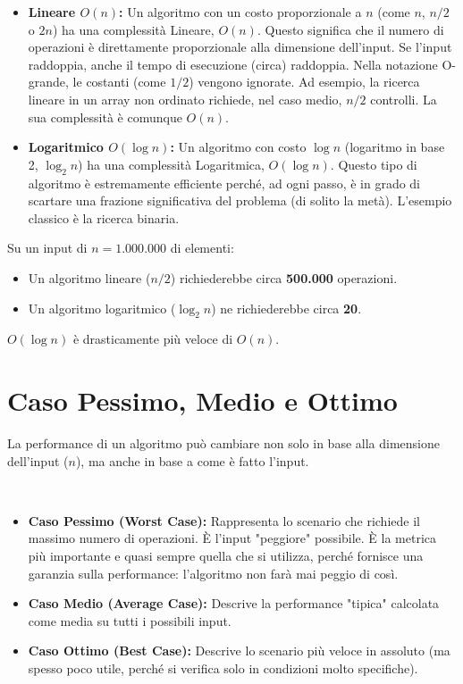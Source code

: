 \begin{itemize}
    \item \textbf{Lineare $O(n)$:} Un algoritmo con un costo proporzionale a $n$ (come $n$, $n/2$ o $2n$) ha una complessità Lineare, $O(n)$. Questo significa che il numero di operazioni è direttamente proporzionale alla dimensione dell'input. Se l'input raddoppia, anche il tempo di esecuzione (circa) raddoppia. Nella notazione O-grande, le costanti (come $1/2$) vengono ignorate. Ad esempio, la ricerca lineare in un array non ordinato richiede, nel caso medio, $n/2$ controlli. La sua complessità è comunque $O(n)$.
    
    \item \textbf{Logaritmico $O(\log n)$:} Un algoritmo con costo $\log n$ (logaritmo in base 2, $\log_2 n$) ha una complessità Logaritmica, $O(\log n)$. Questo tipo di algoritmo è estremamente efficiente perché, ad ogni passo, è in grado di scartare una frazione significativa del problema (di solito la metà). L'esempio classico è la ricerca binaria.
\end{itemize}

\begin{example}
Su un input di $n = 1.000.000$ di elementi:
\begin{itemize}
    \item Un algoritmo lineare ($n/2$) richiederebbe circa \textbf{500.000} operazioni.
    \item Un algoritmo logaritmico ($\log_2 n$) ne richiederebbe circa \textbf{20}.
\end{itemize}
$O(\log n)$ è drasticamente più veloce di $O(n)$.
\end{example}

\section{Caso Pessimo, Medio e Ottimo}
La performance di un algoritmo può cambiare non solo in base alla dimensione dell'input ($n$), ma anche in base a come è fatto l'input.

\begin{observation} \\
\begin{itemize}
    \item \textbf{Caso Pessimo (Worst Case):} Rappresenta lo scenario che richiede il massimo numero di operazioni. È l'input "peggiore" possibile. È la metrica più importante e quasi sempre quella che si utilizza, perché fornisce una garanzia sulla performance: l'algoritmo non farà mai peggio di così.
    \item \textbf{Caso Medio (Average Case):} Descrive la performance "tipica" calcolata come media su tutti i possibili input.
    \item \textbf{Caso Ottimo (Best Case):} Descrive lo scenario più veloce in assoluto (ma spesso poco utile, perché si verifica solo in condizioni molto specifiche).
\end{itemize}
\end{observation}

